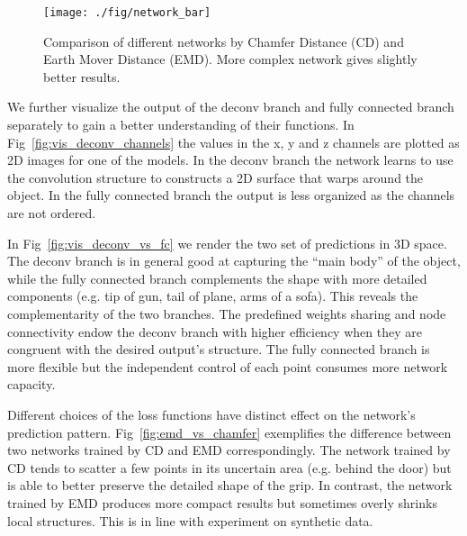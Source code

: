 \documentclass[10pt,twocolumn,letterpaper]{article}
\begin{document}
\begin{figure}[t!]
  \centering
  \texttt{[image: ./fig/network\_bar]}
  \caption{Comparison of different networks by Chamfer Distance (CD) and Earth Mover Distance (EMD). More complex network gives slightly better results. }\label{fig:compare_networks}
  \vspace{-1em}
\end{figure}

We further visualize the output of the deconv branch and fully connected branch separately to gain a better understanding of their functions. In Fig~\ref{fig:vis_deconv_channels} the values in the x, y and z channels are plotted as 2D images for one of the models. In the deconv branch the network learns to use the convolution structure to constructs a 2D surface that warps around the object. In the fully connected branch the output is less organized as the channels are not ordered.


In Fig~\ref{fig:vis_deconv_vs_fc} we render the two set of predictions in 3D space. The deconv branch is in general good at capturing the ``main body'' of the object, while the fully connected branch complements the shape with more detailed components (e.g. tip of gun, tail of plane, arms of a sofa). This reveals the complementarity of the two branches. The predefined weights sharing and node connectivity endow the deconv branch with higher efficiency when they are congruent with the desired output's structure. The fully connected branch is more flexible but the independent control of each point consumes more network capacity.


Different choices of the loss functions have distinct effect on the network's prediction pattern. Fig~\ref{fig:emd_vs_chamfer} exemplifies the difference between two networks trained by CD and EMD correspondingly. The network trained by CD tends to scatter a few points in its uncertain area (e.g. behind the door) but is able to better preserve the detailed shape of the grip. In contrast, the network trained by EMD produces more compact results but sometimes overly shrinks local structures. This is in line with experiment on synthetic data.
\end{document}
